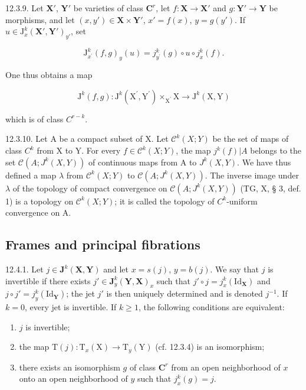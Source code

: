12.3.9. Let \(\mathbf{X}'\), \(\mathbf{Y}'\) be varieties of class \(\mathbf{C}^r\), let \(f: \mathbf{X} \to \mathbf{X}'\) and \(g: \mathbf{Y}' \to \mathbf{Y}\) be morphisms, and let \((x, y') \in \mathbf{X} \times \mathbf{Y}'\), \(x' = f(x)\), \(y = g(y')\). If \(u \in \mathrm{J}_x^k(\mathbf{X}', \mathbf{Y}')_{y'}\), set

\[
\mathrm{J} _ {x ^ {\prime}} ^ {k} (f, g) _ {y} (u) = j _ {y ^ {\prime}} ^ {k} (g) \circ u \circ j _ {x} ^ {k} (f).
\]

One thus obtains a map

\[
\mathrm{J} ^ {k} (f, g) \colon \mathrm{J} ^ {k} (\mathrm{X} ^ {\prime}, \mathrm{Y} ^ {\prime}) \times_ {\mathrm{X} ^ {\prime}} \mathrm{X} \rightarrow \mathrm{J} ^ {k} (\mathrm{X}, \mathrm{Y})
\]

which is of class \(C^{r-k}\).

12.3.10. Let A be a compact subset of X. Let \(\mathcal{C}^{k}(X;Y)\) be the set of maps of class \(C^{k}\) from X to Y. For every \(f\in\mathcal{C}^{k}(X;Y)\), the map \(j^{k}(f)|A\) belongs to the set \(\mathcal{C}(A;J^{k}(X,Y))\) of continuous maps from A to \(J^{k}(X,Y)\). We have thus defined a map \(\lambda\) from \(\mathcal{C}^{k}(X;Y)\) to \(\mathcal{C}(A;J^{k}(X,Y))\). The inverse image under \(\lambda\) of the topology of compact convergence on \(\mathcal{C}(A;J^{k}(X,Y))\) (TG, X, § 3, def. 1) is a topology on \(\mathcal{C}^{k}(X;Y)\); it is called the topology of \(C^{k}\)-uniform convergence on A.

\subsection{Frames and principal fibrations}

12.4.1. Let \(j \in \mathbf{J}^k(\mathbf{X}, \mathbf{Y})\) and let \(x = s(j)\), \(y = b(j)\). We say that \(j\) is invertible if there exists \(j' \in \mathbf{J}_y^k(\mathbf{Y}, \mathbf{X})_x\) such that \(j' \circ j = j_x^k(\mathrm{Id}_{\mathbf{X}})\) and \(j \circ j' = j_y^k(\mathrm{Id}_{\mathbf{Y}})\); the jet \(j'\) is then uniquely determined and is denoted \(j^{-1}\). If \(k = 0\), every jet is invertible. If \(k \geqslant 1\), the following conditions are equivalent:

\begin{enumerate}
\def\labelenumi{\alph{enumi})}
\item
  \(j\) is invertible;
\item
  the map \(\mathrm{T}(j)\colon\mathrm{T}_{x}(\mathrm{X})\rightarrow\mathrm{T}_{y}(\mathrm{Y})\) (cf. 12.3.4) is an isomorphism;
\item
  there exists an isomorphism \(g\) of class \(\mathbf{C}^r\) from an open neighborhood of \(x\) onto an open neighborhood of \(y\) such that \(j_x^k(g) = j\).
\end{enumerate}

